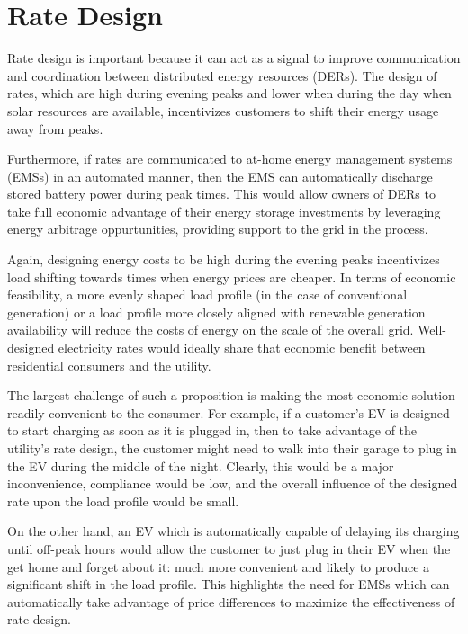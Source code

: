 \documentclass{homework}
\begin{document}
\section{Rate Design}
\begin{letterenum}
\item Rate design is important because it can act as a signal to improve communication and coordination
    between distributed energy resources (DERs). The design of rates, which are high during evening peaks
    and lower when during the day when solar resources are available, incentivizes customers to shift their
    energy usage away from peaks.

    Furthermore, if rates are communicated to at-home energy management systems (EMSs) in an automated manner, 
    then the EMS can automatically discharge stored battery power during peak times. This would allow
    owners of DERs to take full economic advantage of their energy storage investments by leveraging
    energy arbitrage oppurtunities, providing support to the grid in the process.

\item Again, designing energy costs to be high during the evening peaks incentivizes load shifting
    towards times when energy prices are cheaper. In terms of economic feasibility, a more evenly
    shaped load profile (in the case of conventional generation) or a load profile more closely aligned
    with renewable generation availability will reduce the costs of energy on the scale of the overall grid.
    Well-designed electricity rates would ideally share that economic benefit between residential consumers and
    the utility.

    The largest challenge of such a proposition is making the most economic solution readily
    convenient to the consumer. For example, if a customer's EV is designed to start charging as soon
    as it is plugged in, then to take advantage of the utility's rate design, the customer
    might need to walk into their garage to plug in the EV during the middle of the night. Clearly,
    this would be a major inconvenience, compliance would be low, and the overall influence of the designed
    rate upon the load profile would be small.

    On the other hand, an EV which is automatically capable of delaying its charging until off-peak hours
    would allow the customer to just plug in their EV when the get home and forget about it: much more convenient
    and likely to produce a significant shift in the load profile. This highlights the need for EMSs
    which can automatically take advantage of price differences to maximize the effectiveness of rate design.
\end{letterenum}



\end{document}
